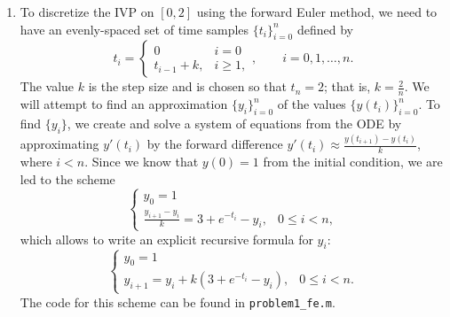 \documentclass{homework}
\begin{document}
\begin{arabicparts}
		\questionpart
		\begin{enumerate}[label=({\bf\alph*})]
			\item To discretize the IVP on $[0,2]$ using the forward Euler method, we need to have an evenly-spaced set of time samples $\{t_i\}_{i=0}^n$ defined by
			\begin{equation}
				t_i = \begin{cases}
					0 & i = 0 \\
					t_{i-1} + k, & i \ge 1,
				\end{cases}, \qquad i = 0,1,\dots,n.
			\end{equation}
			The value $k$ is the step size and is chosen so that $t_n = 2$; that is, $k = \frac{2}{n}$. We will attempt to find an approximation $\{y_i\}_{i=0}^n$ of the values $\{y(t_i)\}_{i=0}^n$. To find $\{y_i\}$, we create and solve a system of equations from the ODE by approximating $y'(t_i)$ by the forward difference $y'(t_i) \approx \frac{y(t_{i+1}) - y(t_i)}{k}$, where $i < n$. Since we know that $y(0) = 1$ from the initial condition, we are led to the scheme
			\begin{equation}
				\begin{cases}
					y_0 = 1 &\\
					\frac{y_{i+1} - y_i}{k} = 3 + e^{-t_i} - y_i, & 0\le i < n,
				\end{cases}
			\end{equation}
			which allows to write an explicit recursive formula for $y_i$:
			\begin{equation}
				\begin{cases}
					y_0 = 1 &\\
					y_{i+1} = y_i + k(3 + e^{-t_i} - y_i), & 0\le i < n.
				\end{cases}
			\end{equation}
			The code for this scheme can be found in \lstinline{problem1_fe.m}.
			

\end{enumerate}
\end{arabicparts}
\end{document}

